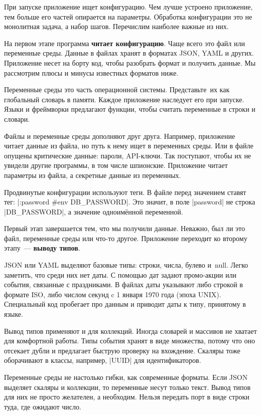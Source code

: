 При запуске приложение ищет конфигурацию. Чем лучше устроено приложение, тем
больше его частей опирается на параметры. Обработка конфигурации это не
монолитная задача, а набор шагов. Перечислим наиболее важные из них.

На первом этапе программа \textbf{читает конфигурацию}. Чаще всего это файл или
переменные среды. Данные в файлах хранят в форматах JSON, YAML и
других. Приложение несет на борту код, чтобы разобрать формат и получить
данные. Мы рассмотрим плюсы и минусы известных форматов ниже.

Переменные среды это часть операционной системы. Представьте~их как глобальный
словарь в памяти. Каждое приложение наследует его при запуске. Языки и
фреймворки предлагают функции, чтобы считать переменные в строки и словари.

Файлы и переменные среды дополняют друг друга. Например, приложение читает
данные из файла, но путь к нему ищет в переменных среды. Или в файле опущены
критические данные: пароли, API-ключи. Так поступают, чтобы их не увидели другие
программы, в том числе шпионские. Приложение читает параметры из файла, а
секретные данные из переменных.


Продвинутые конфигурации используют теги. В файле перед значением
ставят тег: \spverb|:password #env DB_PASSWORD|. Это значит, в поле
\spverb|password| не строка \spverb|DB_PASSWORD|, а значение одноим\"{е}нной
переменной.

Первый этап завершается тем, что мы получили данные. Неважно, был ли это файл,
переменные среды или что-то другое. Приложение переходит ко второму этапу~---
\textbf{выводу типов}.


JSON или YAML выделяют базовые типы: строки, числа, булево и~null. Легко
заметить, что среди них нет даты. С помощью дат задают промо-акции или события,
связанные с праздниками. В файлах даты указывают либо строкой в формате ISO,
либо числом секунд c 1 января 1970 года (эпоха UNIX). Специальный код пробегает
про данным и приводит даты к типу, принятому в языке.

Вывод типов применяют и для коллекций. Иногда словарей и массивов не хватает для
комфортной работы. Типы события хранят в виде множества, потому что оно отсекает
дубли и предлагает быструю проверку на вхождение. Скаляры тоже оборачивают в
классы, например, \spverb|UUID| для идентификаторов.

Переменные среды не настолько гибки, как современные форматы. Если JSON выделяет
скаляры и коллекции, то переменные несут только текст. Вывод типов для них не
просто желателен, а необходим. Нельзя передать порт в виде строки туда, где
ожидают число.

